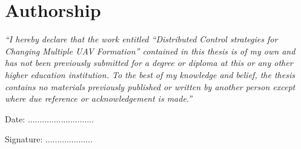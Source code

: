 \chapter*{Authorship}
\textit{``I hereby declare that the work entitled ``Distributed Control strategies for Changing Multiple UAV Formation'' contained in this thesis is of my own and has not been previously submitted for a degree or diploma at this or any other higher education institution. To the best of my knowledge and belief, the thesis contains no materials previously published or written by another person except where due reference or acknowledgement is made.''
}
\vspace{0.5cm}

\begin{flushleft}
    Date: ............................\quad\par

    \vspace{0.5cm}
    
    Signature: ....................
\end{flushleft}